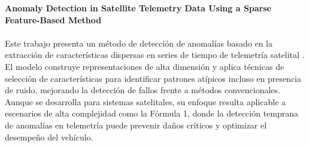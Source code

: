 \textbf{Anomaly Detection in Satellite Telemetry Data Using a Sparse Feature-Based Method} \\\\
Este trabajo presenta un método de detección de anomalías basado en la extracción de características dispersas en series de tiempo de telemetría satelital \cite{vos_anomaly_2022}. El modelo construye representaciones de alta dimensión y aplica técnicas de selección de características para identificar patrones atípicos incluso en presencia de ruido, mejorando la detección de fallos frente a métodos convencionales. Aunque se desarrolla para sistemas satelitales, su enfoque resulta aplicable a escenarios de alta complejidad como la Fórmula 1, donde la detección temprana de anomalías en telemetría puede prevenir daños críticos y optimizar el desempeño del vehículo.